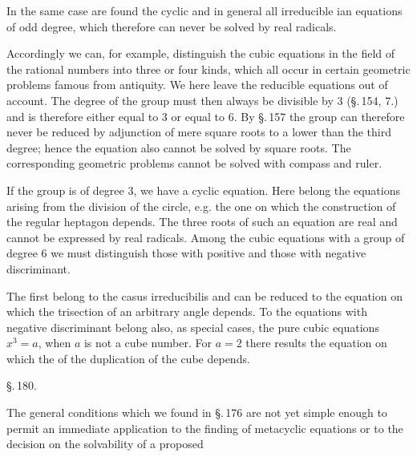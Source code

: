 In the same case are found the cyclic and in general all irreducible
ian equations of odd degree, which therefore can never be solved by real
radicals.

Accordingly we can, for example, distinguish the cubic equations in the field of the
rational numbers into three or four kinds, which all occur in certain geometric
problems famous from antiquity. We here leave the reducible equations out of account.
The degree of the  group must then always be divisible by 3
(\S.\,154, 7.) and is therefore either equal to 3 or equal to 6. By \S.\,157 the group
can therefore never be reduced by adjunction of mere square roots to a lower than
the third degree; hence the equation also cannot be solved by
square roots. The corresponding geometric problems cannot be solved with
compass and ruler.

If the group is of degree 3, we have a cyclic equation. Here belong the
equations arising from the division of the circle, e.g. the one on which the construction
of the regular heptagon depends. The three roots of such an equation are real
and cannot be expressed by real radicals. Among the cubic
equations with a group of degree $6$ we must distinguish those with
positive and those with negative discriminant.

The first belong to the casus irreducibilis and can be reduced to the
equation on which the trisection of an arbitrary angle depends. To the
equations with negative discriminant belong also, as special cases, the pure
cubic equations $x^3 = a$, when $a$ is not a cube number. For $a = 2$ there results
the equation on which the  of the duplication of the cube depends.

{\centering\S.\,180.\par}
{\centering {}\par}

The general conditions which we found in \S.\,176 are not yet
simple enough to permit an immediate application to the finding of metacyclic
equations or to the decision on the solvability of a proposed
